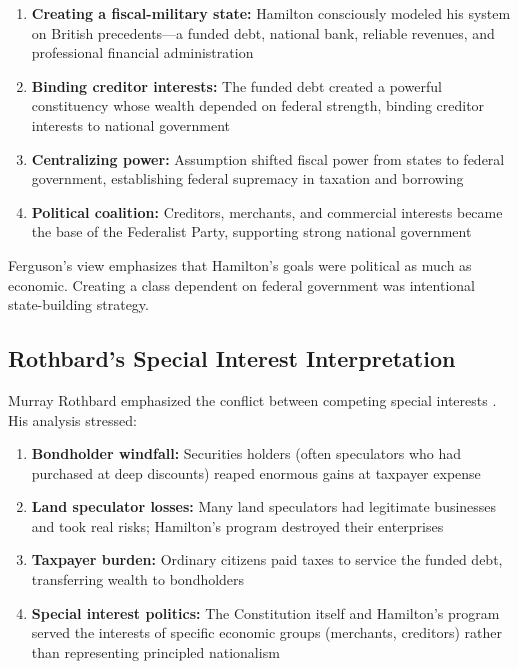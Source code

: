 \documentclass[12pt]{article}
\begin{document}
\begin{enumerate}
\item \textbf{Creating a fiscal-military state:} Hamilton consciously modeled his system on British precedents---a funded debt, national bank, reliable revenues, and professional financial administration

\item \textbf{Binding creditor interests:} The funded debt created a powerful constituency whose wealth depended on federal strength, binding creditor interests to national government

\item \textbf{Centralizing power:} Assumption shifted fiscal power from states to federal government, establishing federal supremacy in taxation and borrowing

\item \textbf{Political coalition:} Creditors, merchants, and commercial interests became the base of the Federalist Party, supporting strong national government
\end{enumerate}

Ferguson's view emphasizes that Hamilton's goals were political as much as economic. Creating a class dependent on federal government was intentional state-building strategy.

\subsection{Rothbard's Special Interest Interpretation}

Murray Rothbard emphasized the conflict between competing special interests \citep{Rothbard1999, Rothbard2011}. His analysis stressed:

\begin{enumerate}
\item \textbf{Bondholder windfall:} Securities holders (often speculators who had purchased at deep discounts) reaped enormous gains at taxpayer expense

\item \textbf{Land speculator losses:} Many land speculators had legitimate businesses and took real risks; Hamilton's program destroyed their enterprises

\item \textbf{Taxpayer burden:} Ordinary citizens paid taxes to service the funded debt, transferring wealth to bondholders

\item \textbf{Special interest politics:} The Constitution itself and Hamilton's program served the interests of specific economic groups (merchants, creditors) rather than representing principled nationalism
\end{enumerate}
\end{document}
